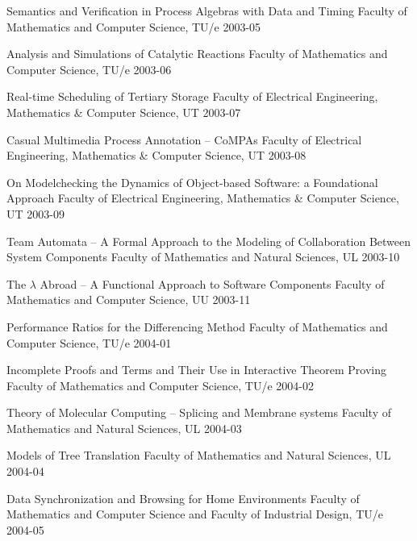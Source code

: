 \begin{multicols}{2}
     {Semantics and Verification in Process Algebras with Data and Timing}
         {Faculty of Mathematics and Computer Science, TU/e}
         {2003-05}

     {Analysis and Simulations of Catalytic Reactions}
         {Faculty of Mathematics and Computer Science, TU/e}
         {2003-06}

     {Real-time Scheduling of Tertiary Storage}
         {Faculty of Electrical Engineering, Mathematics \& Computer Science, UT}
         {2003-07}

     {Casual Multimedia Process Annotation -- CoMPAs}
         {Faculty of Electrical Engineering, Mathematics \& Computer Science, UT}
         {2003-08}

     {On Modelchecking the Dynamics of Object-based Software: a Foundational
         Approach}
         {Faculty of Electrical Engineering, Mathematics \& Computer Science, UT}
         {2003-09}

     {Team Automata -- A Formal Approach to the Modeling of Collaboration Between System Components}
         {Faculty of Mathematics and Natural Sciences, UL}
         {2003-10}

     {The $\lambda$ Abroad -- A Functional Approach to Software Components}
         {Faculty of Mathematics and Computer Science, UU}
         {2003-11}

     {Performance Ratios for the Differencing Method}
         {Faculty of Mathematics and Computer Science, TU/e}
         {2004-01}

     {Incomplete Proofs and Terms and Their Use in Interactive Theorem Proving}
         {Faculty of Mathematics and Computer Science, TU/e}
         {2004-02}

     {Theory of Molecular Computing -- Splicing and Membrane systems}
         {Faculty of Mathematics and Natural Sciences, UL}
         {2004-03}

     {Models of Tree Translation}
         {Faculty of Mathematics and Natural Sciences, UL}
         {2004-04}

     {Data Synchronization and Browsing for Home Environments}
         {Faculty of Mathematics and Computer Science and Faculty of Industrial Design, TU/e}
         {2004-05}


\end{multicols}
